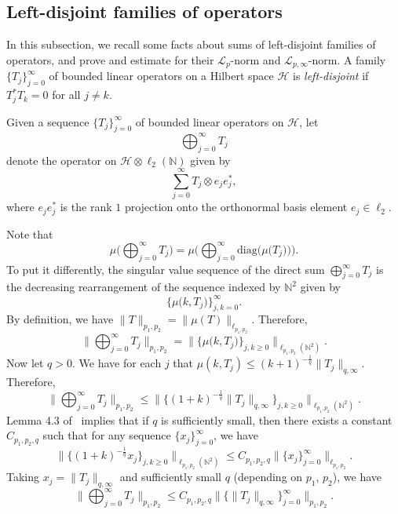 \documentclass[pdftex]{sigma}
\numberwithin{equation}{section}
\begin{document}
\subsection{Left-disjoint families of operators}
In this subsection, we recall some facts about sums of left-disjoint families of operators, and prove and estimate for their $\mathcal{L}_{p}$-norm and $\mathcal{L}_{p,\infty}$-norm. A family  $ \{T_j \}_{j=0}^\infty$
 of bounded linear operators on a Hilbert space $\mathcal{H}$ is \emph{left-disjoint} if $T_j^*T_k = 0$ for all $j\neq k.$

Given a sequence $\big\{T_j\big\}_{j=0}^\infty$ of bounded linear operators on $\mathcal{H}$, let
\[
 \bigoplus_{j=0}^\infty T_j
\]
denote the operator on $\mathcal{H}\otimes \ell_2(\mathbb{N})$ given by
\[
 \sum_{j=0}^\infty T_j\otimes e_je_j^*,
\]
where $e_je_j^*$ is the rank $1$ projection onto the orthonormal basis element $e_j \in \ell_2.$

Note that
\[
 \mu\Bigg(\bigoplus_{j=0}^\infty T_j\Bigg) = \mu\Bigg(\bigoplus_{j=0}^\infty \mathrm{diag}\big(\mu\big(T_j\big)\big)\Bigg).
\]
To put it differently, the singular value sequence of the direct sum $\bigoplus_{j=0}^\infty T_j$ is the decreasing rearrangement of the sequence indexed by $\mathbb{N}^2$ given by
\[
 \big\{\mu\big(k,T_j\big)\big\}_{j,k= 0}^\infty.
\]
By definition, we have $\|T\|_{p_1,p_2} = \|\mu(T)\|_{\ell_{p_1,p_2}}.$ Therefore,
\[
 \Bigg\|\bigoplus_{j=0}^\infty T_j\Bigg\|_{p_1, p_2} = \big\|\big\{\mu\big(k,T_j\big)\big\}_{j,k\geq 0}\big\|_{\ell_{p_1, p_2}(\mathbb{N}^2)}.
\]
Now let $q>0$. We have for each $j$ that  $\mu(k,T_j)\leq (k+1)^{-\frac1q}\|T_j\|_{q,\infty}$.  Therefore,
\[
 \Bigg\|\bigoplus_{j=0}^\infty T_j\Bigg\|_{p_1,p_2} \leq \big\|\big\{(1+k)^{-\frac1q}\|T_j\|_{q,\infty}\big\}_{j,k\geq 0}\big\|_{\ell_{p_1,p_2}(\mathbb{N}^2)}.
\]
Lemma 4.3 of~\cite{LevitinaSukochev2020} implies that if $q$ is sufficiently small, then there exists a constant $C_{p_1,p_2,q}$ such that for any sequence $\{x_j\}_{j=0}^\infty$, we have
\[
 \bigl\|\bigl\{(1+k)^{-\frac1q}x_j\bigr\}_{j,k\geq 0}\bigr\|_{\ell_{p_1,p_2}(\mathbb{N}^2)} \leq C_{p_1,p_2,q}\|\{x_j\}_{j=0}^\infty\|_{\ell_{p_1,p_2}}.
\]
Taking $x_j=\|T_j\|_{q,\infty}$ and sufficiently small $q$ (depending on $p_1$, $p_2$), we have
\begin{equation}\label{direct_sum_quasinorm_bound}
 \Bigg\|\bigoplus_{j=0}^\infty T_j\Bigg\|_{p_1,p_2} \leq C_{p_1,p_2,q} \big\|\{\|T_j\|_{q,\infty}\}_{j=0}^\infty \big\|_{p_1,p_2}.
\end{equation}
\end{document}
